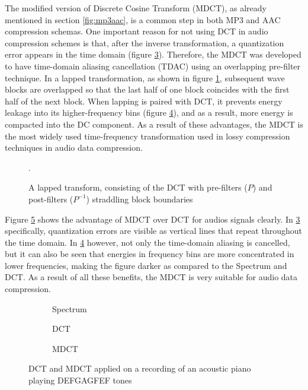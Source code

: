 The modified version of Discrete Cosine Transform (MDCT), as already mentioned in section \ref{fig:mp3aac}, is a common step in both MP3 and AAC compression schemas. One important reason for not using DCT in audio compression schemes is that, after the inverse transformation, a quantization error appears in the time domain (figure \ref{fig:piano-dct}). Therefore, the MDCT was developed to have time-domain aliasing cancellation (TDAC) using an overlapping pre-filter technique\cite{Princen1986TDAC}. In a lapped transformation, as shown in figure \ref{fig:lapped-dct}, subsequent wave blocks are overlapped so that the last half of one block coincides with the first half of the next block. When lapping is paired with DCT, it prevents energy leakage into its higher-frequency bins (figure \ref{fig:piano-mdct}), and as a result, more energy is compacted into the DC component. As a result of these advantages, the MDCT is the most widely used time-frequency transformation used in lossy compression techniques in audio data compression.

\begin{figure}[ht]
  
  \caption{A lapped transform, consisting of the DCT with pre-filters ($P$) and post-filters ($P^{-1}$) straddling block boundaries\cite{christopher_montgomery_next_2013}}.
  \label{fig:lapped-dct}
\end{figure}

Figure \ref{fig:piano-dct-mdct} shows the advantage of MDCT over DCT for audios signals clearly. In \ref{fig:piano-dct} specifically, quantization errors are visible as vertical lines that repeat throughout the time domain. In \ref{fig:piano-mdct} however, not only the time-domain aliasing is cancelled, but it can also be seen that energies in frequency bins are more concentrated in lower frequencies, making the figure darker as compared to the Spectrum and DCT. As a result of all these benefits, the MDCT is very suitable for audio data compression.

\begin{figure}[ht]
\centering
\begin{subfigure}{0.32\textwidth}
    
    \caption{Spectrum}
    \label{fig:piano-full-spec}
\end{subfigure}
\hfill
\begin{subfigure}{0.32\textwidth}
    
    \caption{DCT}
    \label{fig:piano-dct}
\end{subfigure}
\hfill
\begin{subfigure}{0.32\textwidth}
    
    \caption{MDCT}
    \label{fig:piano-mdct}
\end{subfigure}
\caption{DCT and MDCT applied on a recording of an acoustic piano playing DEFGAGFEF tones}
\label{fig:piano-dct-mdct}
\end{figure}

